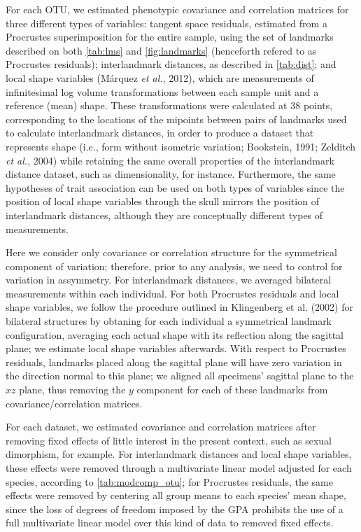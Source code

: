 \documentclass[11pt,twoside]{report}
\begin{document}
For each OTU, we estimated phenotypic covariance and correlation
matrices for three different types of variables: tangent space
residuals, estimated from a Procrustes superimposition for the entire
sample, using the set of landmarks described on both \autoref{tab:lms}
and \autoref{fig:landmarks} (henceforth refered to as Procrustes
residuals); interlandmark distances, as described in \autoref{tab:dist};
and local shape variables (Márquez \emph{et al.}, 2012), which are
measurements of infinitesimal log volume transformations between each
sample unit and a reference (mean) shape. These transformations were
calculated at 38 points, corresponding to the locations of the mipoints
between pairs of landmarks used to calculate interlandmark distances, in
order to produce a dataset that represents shape (i.e., form without
isometric variation; Bookstein, 1991; Zelditch \emph{et al.}, 2004)
while retaining the same overall properties of the interlandmark
distance dataset, such as dimensionality, for instance. Furthermore, the
same hypotheses of trait association can be used on both types of
variables since the position of local shape variables through the skull
mirrors the position of interlandmark distances, although they are
conceptually different types of measurements.

Here we consider only covariance or correlation structure for the
symmetrical component of variation; therefore, prior to any analysis, we
need to control for variation in assymmetry. For interlandmark
distances, we averaged bilateral measurements within each individual.
For both Procrustes residuals and local shape variables, we follow the
procedure outlined in Klingenberg et al. (2002) for bilateral structures
by obtaning for each individual a symmetrical landmark configuration,
averaging each actual shape with its reflection along the sagittal
plane; we estimate local shape variables afterwards. With respect to
Procrustes residuals, landmarks placed along the sagittal plane will
have zero variation in the direction normal to this plane; we aligned
all specimens' sagittal plane to the $xz$ plane, thus removing the $y$
component for each of these landmarks from covariance/correlation
matrices.

For each dataset, we estimated covariance and correlation matrices after
removing fixed effects of little interest in the present context, such
as sexual dimorphism, for example. For interlandmark distances and local
shape variables, these effects were removed through a multivariate
linear model adjusted for each species, according to
\autoref{tab:modcomp_otu}; for Procrustes residuals, the same effects
were removed by centering all group means to each species' mean shape,
since the loss of degrees of freedom imposed by the GPA prohibits the
use of a full multivariate linear model over this kind of data to
removed fixed effects.
\end{document}
